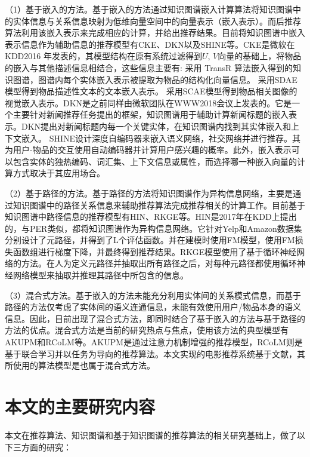 \documentclass{bjfuthesis}
\begin{document}
（1）基于嵌入的方法。基于嵌入的方法通过知识图谱嵌入计算算法将知识图谱中的实体信息与关系信息映射为低维向量空间中的向量表示（嵌入表示）。而后推荐算法利用该嵌入表示来完成相应的计算，并给出推荐结果。目前将知识图谱中嵌入表示信息作为辅助信息的推荐模型有CKE\cite{zhang2016collaborative}、DKN\cite{wang2018dkn}以及SHINE\cite{wang2018shine}等。CKE是微软在 KDD2016 年发表的，其模型结构在原有系统过滤得到$U$, $V$向量的基础上，将物品的嵌入与其他描述信息相结合，这些信息主要有:
采用 TransR 算法嵌入得到的知识图谱，图谱内每个实体嵌入表示被提取为物品的结构化向量信息。
采用SDAE模型得到物品描述性文本的文本嵌入表示。
采用SCAE模型得到物品相关图像的视觉嵌入表示。DKN是之前同样由微软团队在WWW2018会议上发表的。它是一个主要针对新闻推荐任务提出的框架，知识图谱用于辅助计算新闻标题的嵌入表示。DKN提出对新闻标题内每一个关键实体，在知识图谱内找到其实体嵌入和上下文嵌入。
SHINE设计深度自编码器来嵌入语义网络，社交网络并进行推荐。其为用户-物品的交互使用自动编码器并计算用户感兴趣的概率。此外，嵌入表示可以包含实体的独热编码\cite{koren2008factorization}、词汇集\cite{wang2018dkn}、上下文信息\cite{sun2017collaborative}或属性\cite{wang2018shine}，而选择哪一种嵌入向量的计算方式取决于其应用场合。

（2）基于路径的方法。基于路径的方法将知识图谱作为异构信息网络，主要是通过知识图谱中的路径关系信息来辅助推荐算法完成推荐相关的计算工作。目前基于知识图谱中路径信息的推荐模型有HIN\cite{zhao2017meta}、RKGE\cite{sun2018recurrent}等。HIN是2017年在KDD上提出的，与PER\cite{yu2014personalized}类似，都将知识图谱作为异构信息网络。它针对Yelp和Amazon数据集分别设计了元路径，并得到了L个评估函数。并在建模时使用FM模型，使用FM损失函数组进行梯度下降，并最终得到推荐结果。RKGE模型使用了基于循环神经网络的方法。在人为定义元路径并抽取出所有路径之后，对每种元路径都使用循环神经网络模型来抽取并推理其路径中所包含的信息。

（3）混合式方法。基于嵌入的方法未能充分利用实体间的关系模式信息，而基于路径的方法仅考虑了实体间的语义连通信息，未能有效使用用户/物品本身的语义信息。因此，目前出现了混合式方法，即同时结合了基于嵌入的方法与基于路径的方法的优点。混合式方法是当前的研究热点与焦点，使用该方法的典型模型有AKUPM\cite{tang2019akupm}和RCoLM\cite{cao2019unifying}等。AKUPM是通过注意力机制增强的推荐模型，RCoLM则是基于联合学习并以任务为导向的推荐算法。本文实现的电影推荐系统基于文献\parencite{wang2018ripplenet}，其所使用的算法模型是也属于混合式方法。
\section{本文的主要研究内容}
本文在推荐算法、知识图谱和基于知识图谱的推荐算法的相关研究基础上，做了以下三方面的研究：
\end{document}

